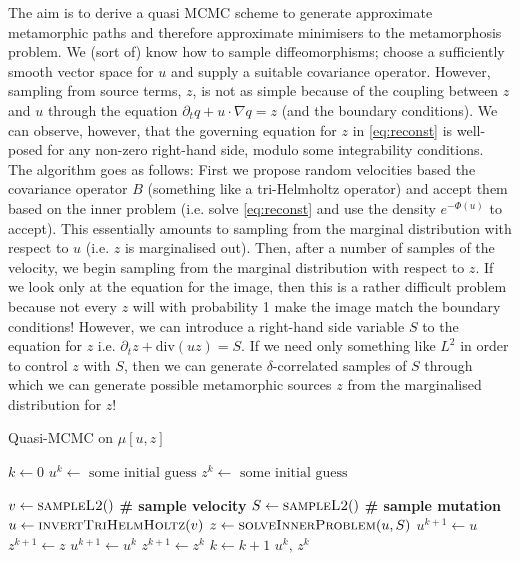 \documentclass{article}
\begin{document}
The aim is to derive a quasi MCMC scheme to generate approximate metamorphic
paths and therefore
approximate minimisers to the metamorphosis problem. We (sort of) know how to
sample diffeomorphisms; choose a sufficiently smooth vector space for $u$ and
supply a suitable covariance operator. However, sampling from source terms, $z$,
is not as simple because of the coupling between $z$ and $u$ through the
equation $\partial_t q + u\cdot\nabla q = z$ (and the boundary conditions).  We
can observe, however, that the governing equation for $z$ in \eqref{eq:reconst}
is well-posed for any non-zero right-hand side, modulo some integrability
conditions. The algorithm goes as follows: First we propose random velocities
based the covariance operator $B$ (something like a tri-Helmholtz operator) and
accept them based on the inner problem (i.e.  solve \eqref{eq:reconst} and use
the density $e^{-\Phi(u)}$ to accept). This essentially amounts to sampling from
the marginal distribution with respect to $u$ (i.e. $z$ is marginalised out).
Then, after a number of samples of the velocity, we begin sampling from the
marginal distribution with respect to $z$. If we look only at the equation for
the image, then this is a rather difficult problem because not every $z$ will
with probability 1 make the image match the boundary conditions! However, we
can introduce a right-hand side variable $S$ to the equation for $z$ i.e.
$\partial_t z + \text{div}(u z) = S$. If we need only something like $L^2$ in
order to control $z$ with $S$, then we can generate $\delta$-correlated samples
of $S$ through which we can generate possible metamorphic sources $z$ from the
marginalised distribution for $z$!\\

\newcommand{\mhsample}{\textsc{sampleL2}}
\newcommand{\inverthh}{\textsc{invertTriHelmHoltz}}
\newcommand{\acceptprob}{\textsc{acceptanceProbability}}
\newcommand{\solveinner}{\textsc{solveInnerProblem}}
\begin{algorithm}
\begin{algorithmic}
\caption{Quasi-MCMC on $\mu[u,z]$}
\State $k \gets 0$
\State $u^k \gets \text{ some initial guess}$
\State $z^k \gets \text{ some initial guess}$

\State $v \gets \mhsample ()$\hspace{3cm} \textbf{\# sample velocity}
\State $S \gets \mhsample ()$\hspace{3cm} \textbf{\# sample mutation}
\State $u \gets \inverthh (v)$
\State $z \gets \solveinner (u, S)$
\If {\textsc{randomUnit()}$\,< \acceptprob(z^k, z)$}
    \State $u^{k+1} \gets u$
    \State $z^{k+1} \gets z$
\Else
    \State $u^{k+1} \gets u^k$
    \State $z^{k+1} \gets z^k$
\EndIf
\State $k\gets k+1$
\EndWhile
\Return $u^k,\, z^k$
\EndProcedure
\end{algorithmic}
\end{algorithm}
\end{document}
